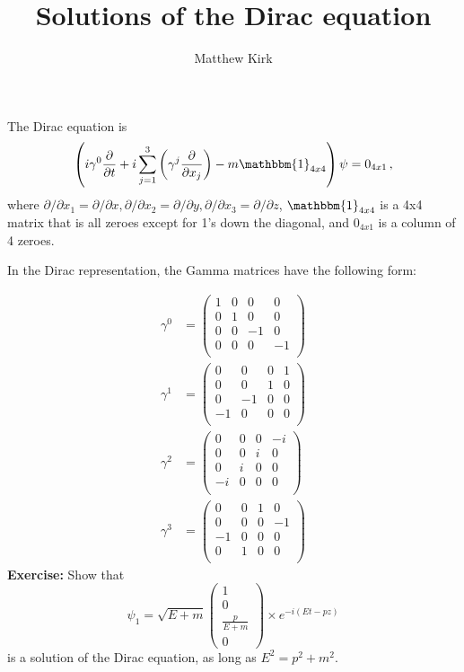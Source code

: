 \documentclass[a4paper,11pt]{article}
\author{Matthew Kirk}
\title{Solutions of the Dirac equation}
\numberwithin{equation}{section} %
\begin{document}
\maketitle


The Dirac equation is
\begin{equation}
\left( i \gamma^0 \frac{\partial}{\partial t} + i \sum_{j=1}^{3} \left( \gamma^j \frac{\partial}{\partial x_j} \right) - m \mathbbm{1}_{4x4} \right) \psi = 0_{4x1} \,,
\end{equation}
where $\partial / \partial x_1 = \partial / \partial x, \partial / \partial x_2 = \partial / \partial y, \partial / \partial x_3 = \partial / \partial z$, $\mathbbm{1}_{4x4}$ is a 4x4 matrix that is all zeroes except for 1's down the diagonal, and $0_{4x1}$ is a column of 4 zeroes.

In the Dirac representation, the Gamma matrices have the following form:

\begin{align}
\gamma^0 &= \begin{pmatrix}
 1 & 0 & 0 & 0 \\
 0 & 1 & 0 & 0 \\
 0 & 0 & -1 & 0 \\
 0 & 0 & 0 & -1 \\
\end{pmatrix}
\\
\gamma^1 &= \begin{pmatrix}
 0 & 0 & 0 & 1 \\
 0 & 0 & 1 & 0 \\
 0 & -1 & 0 & 0 \\
 -1 & 0 & 0 & 0 \\
\end{pmatrix}
\\
\gamma^2 &= \begin{pmatrix}
 0 & 0 & 0 & -i \\
 0 & 0 & i & 0 \\
 0 & i & 0 & 0 \\
 -i & 0 & 0 & 0 \\
\end{pmatrix}
\\
\gamma^3 &= \begin{pmatrix}
 0 & 0 & 1 & 0 \\
 0 & 0 & 0 & -1 \\
 -1 & 0 & 0 & 0 \\
 0 & 1 & 0 & 0 \\
\end{pmatrix}
\end{align}
\textbf{Exercise:} Show that
\begin{equation}
\psi_1 = \sqrt{E+m} \begin{pmatrix} 1 \\ 0 \\ \frac{p}{E+m} \\ 0 \end{pmatrix} \times e^{-i (E t - p z)}
\end{equation}
is a solution of the Dirac equation, as long as $E^2 = p^2 + m^2$.
\end{document}
